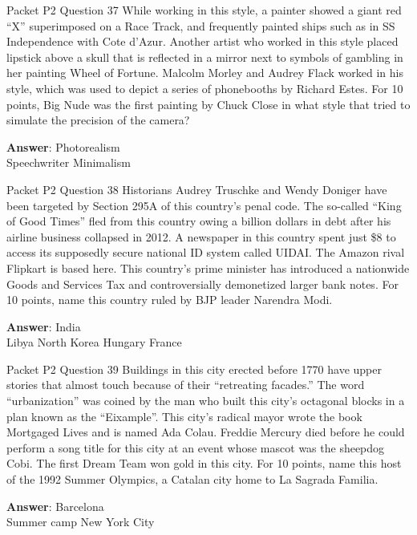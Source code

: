 \begin{frame}{Packet P2 Question 37}
While working in this   style, a painter showed a giant red ``X'' superimposed on a Race Track, and frequently painted ships such as in SS Independence with Cote d'Azur. Another artist who worked in this style placed lipstick above a skull that is reflected in a mirror next to symbols of gambling in her painting Wheel of Fortune. Malcolm Morley and Audrey Flack worked in his style, which was used to depict a series of phonebooths by Richard Estes. For 10 points, Big Nude was the first   painting by Chuck Close in what style   that tried to simulate the precision of the camera?  

\textbf{Answer}: Photorealism\\
 Speechwriter
 Minimalism
\end{frame}

\begin{frame}{Packet P2 Question 38}
Historians Audrey Truschke and Wendy Doniger have been targeted by Section 295A of this country's penal code. The so-called ``King of Good Times'' fled from this country owing a billion dollars in debt after his airline business collapsed in 2012. A newspaper in this country spent just \$8 to access its supposedly secure national ID system called UIDAI. The Amazon rival Flipkart is based here. This country's prime minister has introduced a nationwide Goods and Services Tax and controversially demonetized larger bank notes. For 10 points, name this country ruled by BJP leader Narendra Modi.        

\textbf{Answer}: India\\
 Libya
 North Korea
 Hungary
 France
\end{frame}

\begin{frame}{Packet P2 Question 39}
Buildings in this city   erected before 1770 have upper stories that almost touch because of their ``retreating facades.'' The word ``urbanization'' was coined by the man who built this city’s octagonal blocks in a plan known as   the ``Eixample''. This   city’s radical mayor wrote the book Mortgaged Lives and is named Ada Colau. Freddie Mercury died before he could perform   a song title for this city at an event whose mascot was the sheepdog Cobi. The first Dream Team won gold in this city. For 10 points, name this host of the 1992 Summer Olympics, a Catalan city home to La Sagrada Familia.  

\textbf{Answer}: Barcelona\\
 Summer camp
 New York City
\end{frame}


